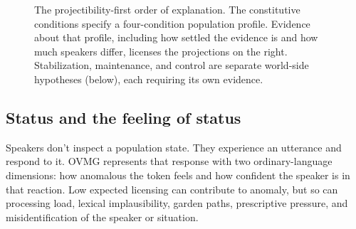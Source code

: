 \begin{figure}[t]
\centering
{}
\caption{The projectibility-first order of explanation. The constitutive
conditions specify a four-condition population profile. Evidence about that
profile, including how settled the evidence is and how much speakers differ,
licenses the projections on the right. Stabilization, maintenance, and control
are separate world-side hypotheses (below), each requiring its own evidence.}
\label{fig:profile-spine}
\end{figure}

\subsection{Status and the feeling of status}
\label{sec:decision-readout}
\label{sec:feeling-new}

Speakers don't inspect a population state. They experience an utterance and
respond to it. OVMG represents that response with two ordinary-language
dimensions: how anomalous the token feels and how confident the speaker is in
that reaction. Low expected licensing can contribute to anomaly, but so can
processing load, lexical implausibility, garden paths, prescriptive pressure,
and misidentification of the speaker or situation.

